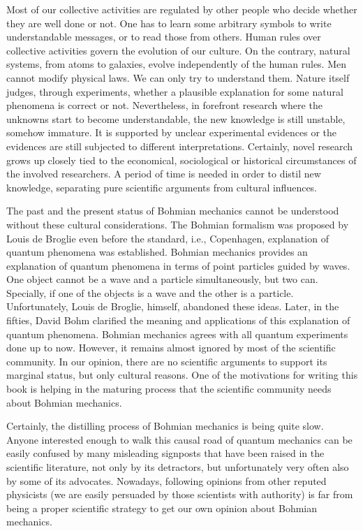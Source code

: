 \documentclass[onecolumn,nofootinbib, secnumarabic, amsmath, nobibnotes,11pt,aps,pra]{revtex4-1}
\begin{document}
Most of our collective activities are regulated by other people who decide whether they are well done or not. One has to learn some arbitrary symbols to write understandable messages, or to read those from others. Human rules over collective activities govern the evolution of our culture. On the contrary, natural systems, from atoms to galaxies, evolve independently of the human rules. Men cannot modify physical laws. We can only try to understand them. Nature itself judges, through experiments, whether a plausible explanation for some natural phenomena is correct or not. Nevertheless, in forefront research where the unknowns start to become understandable, the new knowledge is still unstable, somehow immature. It is supported by unclear experimental evidences or the evidences are still subjected to different interpretations. Certainly, novel research grows up closely tied to the economical, sociological or historical circumstances of the involved researchers.  A period of time is needed in order to distil new knowledge, separating pure scientific arguments from cultural influences.

The past and the present status of Bohmian mechanics cannot be understood without these cultural considerations. The Bohmian formalism was proposed by Louis de Broglie even before the standard, i.e., Copenhagen, explanation of quantum phenomena was established.
Bohmian mechanics provides an explanation of quantum phenomena in terms of point particles guided by waves.
One object cannot be a wave and a particle simultaneously, but two can. Specially, if one of the objects is a wave and the other is a particle. 
Unfortunately, Louis de Broglie, himself, abandoned these ideas. Later, in the fifties, David Bohm clarified the meaning and applications of this explanation of quantum phenomena. Bohmian mechanics agrees with all quantum experiments done up to now. However, it remains almost ignored by most of the scientific community. In our opinion, there are no scientific arguments to support its marginal status, but only cultural reasons. One of the motivations for writing this book is helping in the maturing process that the scientific community needs about Bohmian mechanics.

Certainly, the distilling process of Bohmian mechanics is being quite slow. Anyone interested enough to walk this causal road of quantum mechanics can be easily confused by many misleading signposts that have been raised in the scientific literature, not only by its detractors, but unfortunately very often also by some of its advocates. Nowadays, following opinions from other reputed physicists (we are easily persuaded by those scientists with authority) is far from being a proper scientific strategy to get our own opinion about Bohmian mechanics.
\end{document}
